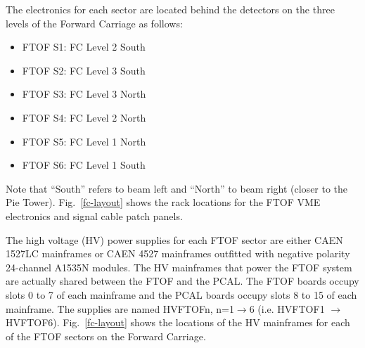 \documentclass[12pt]{article}
\begin{document}
The electronics for each sector are located behind the detectors on the three levels of the Forward 
Carriage as follows:

\vskip 0.5cm

\begin{minipage}{0.5\textwidth}
\begin{itemize}
\item FTOF S1: FC Level 2 South
\item FTOF S2: FC Level 3 South
\item FTOF S3: FC Level 3 North
\end{itemize}
\end{minipage}
\begin{minipage}{0.5\textwidth}
\begin{itemize}
\item FTOF S4: FC Level 2 North
\item FTOF S5: FC Level 1 North
\item FTOF S6: FC Level 1 South
\end{itemize}
\end{minipage}

\vskip 0.5cm

Note that ``South'' refers to beam left and ``North'' to beam right (closer to the Pie Tower). 
Fig.~\ref{fc-layout} shows the rack locations for the FTOF VME electronics and signal cable 
patch panels. 

The high voltage (HV) power supplies for each FTOF sector are either CAEN 1527LC mainframes or
CAEN 4527 mainframes outfitted with negative polarity 24-channel A1535N modules. The HV mainframes 
that power the FTOF system are actually shared between the FTOF and the PCAL. The FTOF boards 
occupy slots 0 to 7 of each mainframe and the PCAL boards occupy slots 8 to 15 of each mainframe. 
The supplies are named HVFTOFn, n=1$\to$6 (i.e. HVFTOF1 $\to$ HVFTOF6). Fig.~\ref{fc-layout} shows 
the locations of the HV mainframes for each of the FTOF sectors on the Forward Carriage.
\end{document}
